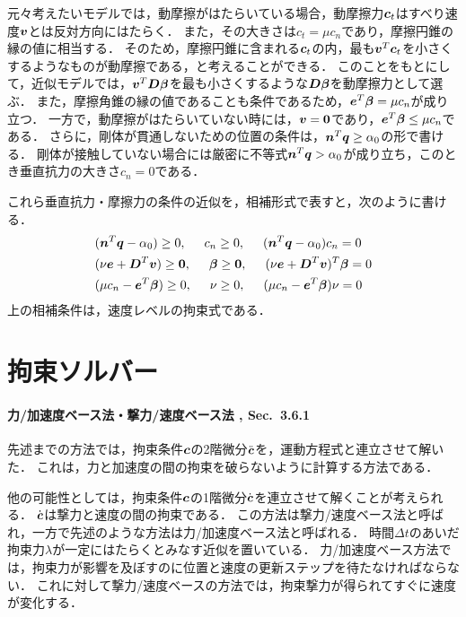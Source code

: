 \documentclass{jsarticle}
\begin{document}
元々考えたいモデルでは，動摩擦がはたらいている場合，動摩擦力$\vc_t$はすべり速度$\vv$とは反対方向にはたらく．
また，その大きさは$c_t=\mu c_n$であり，摩擦円錐の縁の値に相当する．
そのため，摩擦円錐に含まれる$\vc_t$の内，最も$\vv^T\vc_t$を小さくするようなものが動摩擦である，と考えることができる．
このことをもとにして，近似モデルでは，$\vv^T\vD\vbeta$を最も小さくするような$\vD\vbeta$を動摩擦力として選ぶ．
また，摩擦角錐の縁の値であることも条件であるため，$\ve^T\vbeta=\mu c_n$が成り立つ．
一方で，動摩擦がはたらいていない時には，$\vv=\0$であり，$\ve^T\vbeta\le\mu c_n$である．
さらに，剛体が貫通しないための位置の条件は，$\vn^T\vq\ge\alpha_0$の形で書ける．
剛体が接触していない場合には厳密に不等式$\vn^T\vq>\alpha_0$が成り立ち，このとき垂直抗力の大きさ$c_n=0$である．

これら垂直抗力・摩擦力の条件の近似を，相補形式で表すと，次のように書ける．
\begin{align}
&(\vn^T\vq-\alpha_0)\ge0,
\hspace{5mm}c_n\ge0,
\hspace{5mm}(\vn^T\vq-\alpha_0)c_n=0\notag\\
&(\nu\ve + \vD^T\vv)\ge\0,
\hspace{5mm}\vbeta\ge\0,
\hspace{5mm}(\nu\ve + \vD^T\vv)^T\vbeta=0\label{approx_coulomb_condition}\\
&(\mu c_n - \ve^T\vbeta)\ge0,
\hspace{5mm}\nu\ge0,
\hspace{5mm}(\mu c_n - \ve^T\vbeta)\nu=0\notag
\end{align}
上の相補条件は，速度レベルの拘束式である．


\section{拘束ソルバー }
\paragraph{力/加速度ベース法・撃力/速度ベース法 \cite{MThesis2005Garstenauer} , Sec.~3.6.1}
先述までの方法では，拘束条件$\vc$の2階微分$\ddot{\vc}$を，運動方程式と連立させて解いた．
これは，力と加速度の間の拘束を破らないように計算する方法である．

他の可能性としては，拘束条件$\vc$の1階微分$\dot{\vc}$を連立させて解くことが考えられる．
$\dot{\vc}$は撃力と速度の間の拘束である．
この方法は撃力/速度ベース法と呼ばれ，一方で先述のような方法は力/加速度ベース法と呼ばれる．
時間$\Delta t$のあいだ拘束力$\lambda$が一定にはたらくとみなす近似を置いている．
力/加速度ベース方法では，拘束力が影響を及ぼすのに位置と速度の更新ステップを待たなければならない．
これに対して撃力/速度ベースの方法では，拘束撃力が得られてすぐに速度が変化する．
\end{document}
